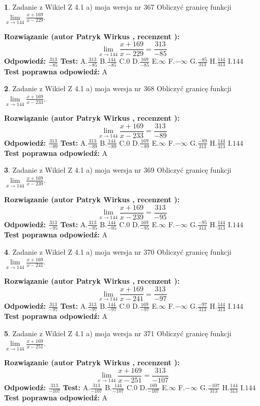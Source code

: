 \documentclass[12pt, a4paper]{article}
\theoremstyle{definition} %
\newtheorem{zad}{}
\newcommand{\zadStart}[1]{\begin{zad}#1\newline}
\newcommand{\zadStop}{\end{zad}}
\newcommand{\rozwStart}[2]{\noindent \textbf{Rozwiązanie (autor #1 , recenzent #2): }\newline}
\newcommand{\rozwStop}{\newline}
\newcommand{\odpStart}{\noindent \textbf{Odpowiedź:}\newline}
\newcommand{\odpStop}{\newline}
\newcommand{\testStart}{\noindent \textbf{Test:}\newline}
\newcommand{\testStop}{\newline}
\newcommand{\kluczStart}{\noindent \textbf{Test poprawna odpowiedź:}\newline}
\newcommand{\kluczStop}{\newline}
\begin{document}
\zadStart{Zadanie z Wikieł Z 4.1 a) moja wersja nr 367}
Obliczyć granicę funkcji $\lim\limits_{x\to144}\frac{x+169}{x-229}$.
\zadStop
\rozwStart{Patryk Wirkus}{}
$$\lim\limits_{x\to144}\frac{x+169}{x-229} = \frac{313}{-85}$$
\rozwStop
\odpStart
$\frac{313}{-85}$
\odpStop
\testStart
A.$\frac{313}{-85}$
B.$\frac{144}{-85}$
C.$0$
D.$\frac{169}{-85}$
E.$\infty$
F.$-\infty$
G.$\frac{-85}{313}$
H.$\frac{144}{313}$
I.$144$
\testStop
\kluczStart
A
\kluczStop



\zadStart{Zadanie z Wikieł Z 4.1 a) moja wersja nr 368}
Obliczyć granicę funkcji $\lim\limits_{x\to144}\frac{x+169}{x-233}$.
\zadStop
\rozwStart{Patryk Wirkus}{}
$$\lim\limits_{x\to144}\frac{x+169}{x-233} = \frac{313}{-89}$$
\rozwStop
\odpStart
$\frac{313}{-89}$
\odpStop
\testStart
A.$\frac{313}{-89}$
B.$\frac{144}{-89}$
C.$0$
D.$\frac{169}{-89}$
E.$\infty$
F.$-\infty$
G.$\frac{-89}{313}$
H.$\frac{144}{313}$
I.$144$
\testStop
\kluczStart
A
\kluczStop



\zadStart{Zadanie z Wikieł Z 4.1 a) moja wersja nr 369}
Obliczyć granicę funkcji $\lim\limits_{x\to144}\frac{x+169}{x-239}$.
\zadStop
\rozwStart{Patryk Wirkus}{}
$$\lim\limits_{x\to144}\frac{x+169}{x-239} = \frac{313}{-95}$$
\rozwStop
\odpStart
$\frac{313}{-95}$
\odpStop
\testStart
A.$\frac{313}{-95}$
B.$\frac{144}{-95}$
C.$0$
D.$\frac{169}{-95}$
E.$\infty$
F.$-\infty$
G.$\frac{-95}{313}$
H.$\frac{144}{313}$
I.$144$
\testStop
\kluczStart
A
\kluczStop



\zadStart{Zadanie z Wikieł Z 4.1 a) moja wersja nr 370}
Obliczyć granicę funkcji $\lim\limits_{x\to144}\frac{x+169}{x-241}$.
\zadStop
\rozwStart{Patryk Wirkus}{}
$$\lim\limits_{x\to144}\frac{x+169}{x-241} = \frac{313}{-97}$$
\rozwStop
\odpStart
$\frac{313}{-97}$
\odpStop
\testStart
A.$\frac{313}{-97}$
B.$\frac{144}{-97}$
C.$0$
D.$\frac{169}{-97}$
E.$\infty$
F.$-\infty$
G.$\frac{-97}{313}$
H.$\frac{144}{313}$
I.$144$
\testStop
\kluczStart
A
\kluczStop



\zadStart{Zadanie z Wikieł Z 4.1 a) moja wersja nr 371}
Obliczyć granicę funkcji $\lim\limits_{x\to144}\frac{x+169}{x-251}$.
\zadStop
\rozwStart{Patryk Wirkus}{}
$$\lim\limits_{x\to144}\frac{x+169}{x-251} = \frac{313}{-107}$$
\rozwStop
\odpStart
$\frac{313}{-107}$
\odpStop
\testStart
A.$\frac{313}{-107}$
B.$\frac{144}{-107}$
C.$0$
D.$\frac{169}{-107}$
E.$\infty$
F.$-\infty$
G.$\frac{-107}{313}$
H.$\frac{144}{313}$
I.$144$
\testStop
\kluczStart
A
\kluczStop
\end{document}
